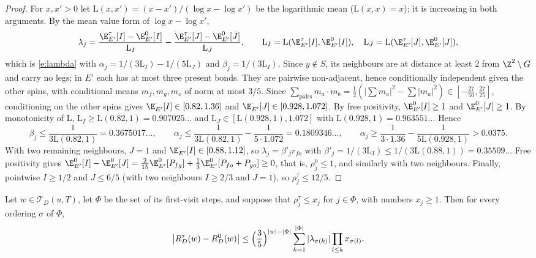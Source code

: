 \begin{proof}
For $x, x' > 0$ let $\mathrm L(x, x') = (x - x')/(\log x - \log x')$ be the logarithmic mean ($\mathrm L(x, x) = x$); it is increasing in both arguments. By the mean value form of $\log x - \log x'$,
\begin{equation*}
\lambda_j = \frac{\E^\tau_{E'}[I] - \E^0_{E'}[I]}{\mathrm L_I} - \frac{\E^\tau_{E'}[J] - \E^0_{E'}[J]}{\mathrm L_J}, \qquad \mathrm L_I = \mathrm L(\E^\tau_{E'}[I], \E^0_{E'}[I]), \quad \mathrm L_J = \mathrm L(\E^\tau_{E'}[J], \E^0_{E'}[J]),
\end{equation*}
which is \eqref{e:lambda} with $\alpha_j = 1/(3 \mathrm L_I) - 1/(5 \mathrm L_J)$ and $\beta_j = 1/(3 \mathrm L_I)$. Since $y \notin S$, its neighbours are at distance at least $2$ from $\Z^2 \setminus G$ and carry no legs; in $E'$ each has at most three present bonds. They are pairwise non-adjacent, hence conditionally independent given the other spins, with conditional means $m_f, m_g, m_o$ of norm at most $3/5$. Since $\sum_{\text{pairs}} m_a \cdot m_b = \frac12 (|\sum m_a|^2 - \sum |m_a|^2) \in [-\frac{27}{50}, \frac{27}{25}]$, conditioning on the other spins gives $\E^\cdot_{E'}[I] \in [0.82, 1.36]$ and $\E^\cdot_{E'}[J] \in [0.928, 1.072]$. By free positivity, $\E^0_{E'}[I] \ge 1$ and $\E^0_{E'}[J] \ge 1$. By monotonicity of $\mathrm L$, $\mathrm L_I \ge \mathrm L(0.82, 1) = 0.907025\ldots$ and $\mathrm L_J \in [\mathrm L(0.928, 1), 1.072]$ with $\mathrm L(0.928, 1) = 0.963551\ldots$ Hence
\begin{equation*}
\beta_j \le \frac{1}{3 \mathrm L(0.82, 1)} = 0.3675017\ldots, \qquad \alpha_j \le \frac{1}{3 \mathrm L(0.82, 1)} - \frac{1}{5 \cdot 1.072} = 0.1809346\ldots, \qquad \alpha_j \ge \frac{1}{3 \cdot 1.36} - \frac{1}{5 \mathrm L(0.928, 1)} > 0.0375 .
\end{equation*}
With two remaining neighbours, $J = 1$ and $\E^\cdot_{E'}[I] \in [0.88, 1.12]$, so $\lambda_j = \beta'_j r_{fo}$ with $\beta'_j = 1/(3 \mathrm L_I) \le 1/(3 \mathrm L(0.88, 1)) = 0.35509\ldots$ Free positivity gives $\E^0_{E'}[I] - \E^0_{E'}[J] = \frac2{15} \E^0_{E'}[P_{fg}] + \frac13 \E^0_{E'}[P_{fo} + P_{go}] \ge 0$, that is, $\rho^0_j \le 1$, and similarly with two neighbours. Finally, pointwise $I \ge 1/2$ and $J \le 6/5$ (with two neighbours $I \ge 2/3$ and $J = 1$), so $\rho^\tau_j \le 12/5$.
\end{proof}

\begin{lemma}\label{l:exposure}
Let $w \in \mathcal T_D(u, T)$, let $\Phi$ be the set of its first-visit steps, and suppose that $\rho^\tau_j \le x_j$ for $j \in \Phi$, with numbers $x_j \ge 1$. Then for every ordering $\sigma$ of $\Phi$,
\begin{equation}\label{e:exposure}
\bigl| R^\tau_D(w) - R^0_D(w) \bigr| \le \Bigl( \frac35 \Bigr)^{|w| - |\Phi|} \sum_{k = 1}^{|\Phi|} |\lambda_{\sigma(k)}| \prod_{l \le k} x_{\sigma(l)} .
\end{equation}
\end{lemma}

